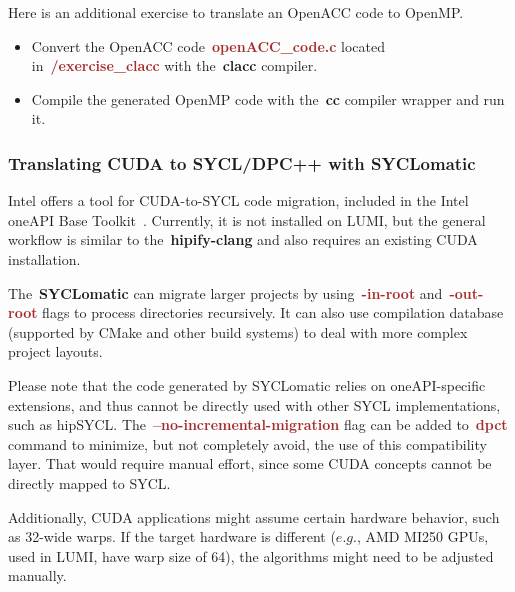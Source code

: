 \par
Here is an additional exercise to translate an OpenACC code to OpenMP.
\begin{itemize}
    \item Convert the OpenACC code~\textbf{\textcolor{brown}{openACC\_code.c}} located in~\textbf{\textcolor{brown}{/exercise\_clacc}} with the~\textbf{clacc} compiler.
    \item Compile the generated OpenMP code with the~\textbf{cc} compiler wrapper and run it.
\end{itemize}


\subsubsection{Translating CUDA to SYCL/DPC++ with SYCLomatic}


\par
Intel offers a tool for CUDA-to-SYCL code migration, included in the Intel oneAPI Base Toolkit~\cite{intel_oneapi_base_toolkit}.
Currently, it is not installed on LUMI, but the general workflow is similar to the~\textbf{hipify-clang} and also requires an existing CUDA installation.



\par
The~\textbf{SYCLomatic} can migrate larger projects by using~\textbf{\textcolor{brown}{-in-root}} and~\textbf{\textcolor{brown}{-out-root}} flags to process directories recursively.
It can also use compilation database (supported by CMake and other build systems) to deal with more complex project layouts.


\par
Please note that the code generated by SYCLomatic relies on oneAPI-specific extensions, and thus cannot be directly used with other SYCL implementations, such as hipSYCL.
The~\textbf{\textcolor{brown}{--no-incremental-migration}} flag can be added to~\textbf{\textcolor{brown}{dpct}} command to minimize, but not completely avoid, the use of this compatibility layer.
That would require manual effort, since some CUDA concepts cannot be directly mapped to SYCL.


\par
Additionally, CUDA applications might assume certain hardware behavior, such as 32-wide warps.
If the target hardware is different ($e.g.$, AMD MI250 GPUs, used in LUMI, have warp size of 64), the algorithms might need to be adjusted manually.


